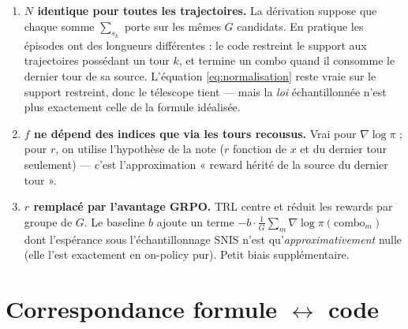 \documentclass{article}
\begin{document}
\begin{enumerate}
  \item \textbf{$N$ identique pour toutes les trajectoires.} La dérivation suppose
  que chaque somme $\sum_{s_k}$ porte sur les mêmes $G$ candidats. En pratique les
  épisodes ont des longueurs différentes : le code restreint le support aux
  trajectoires possédant un tour $k$, et termine un combo quand il consomme le
  dernier tour de sa source. L'équation \eqref{eq:normalisation} reste vraie sur le
  support restreint, donc le télescope tient --- mais la \emph{loi} échantillonnée
  n'est plus exactement celle de la formule idéalisée.
  \item \textbf{$f$ ne dépend des indices que via les tours recousus.} Vrai pour
  $\nabla \log \pi$ ; pour $r$, on utilise l'hypothèse de la note ($r$ fonction de
  $x$ et du dernier tour seulement) --- c'est l'approximation « reward hérité de la
  source du dernier tour ».
  \item \textbf{$r$ remplacé par l'avantage GRPO.} TRL centre et réduit les rewards
  par groupe de $G$. Le baseline $b$ ajoute un terme
  $-b \cdot \frac{1}{G}\sum_m \nabla \log \pi(\text{combo}_m)$ dont l'espérance
  sous l'échantillonnage SNIS n'est qu'\emph{approximativement} nulle (elle l'est
  exactement en on-policy pur). Petit biais supplémentaire.
\end{enumerate}

\section*{Correspondance formule $\leftrightarrow$ code}
\end{document}

